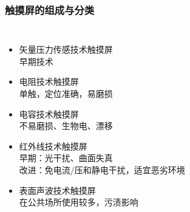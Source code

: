 \documentclass{beamer}
\begin{document}
\begin{frame}
	\frametitle{触摸屏的组成与分类}
	\begin{columns}
	\begin{itemize}[<+->]
		\item 矢量压力传感技术触摸屏\\
			{\tiny 早期技术}
		\item 电阻技术触摸屏\\
			{\tiny 单触，定位准确，易磨损}
		\item 电容技术触摸屏\\
			{\tiny 不易磨损、生物电、漂移}
		\item 红外线技术触摸屏\\
			{\tiny 早期：光干扰、曲面失真\\改进：免电流/压和静电干扰，适宜恶劣环境}
		\item 表面声波技术触摸屏\\
			{\tiny 在公共场所使用较多，污渍影响}
	\end{itemize}
\end{columns}
\end{frame}
\end{document}
